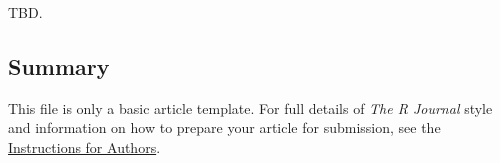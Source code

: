TBD.

\hypertarget{summary}{%
\subsection{Summary}\label{summary}}

This file is only a basic article template. For full details of
\emph{The R Journal} style and information on how to prepare your
article for submission, see the
\href{https://journal.r-project.org/share/author-guide.pdf}{Instructions
for Authors}.




\address{%
Brandon M. Greenwell\\
University of Cincinnati\\%
2925 Campus Green Dr\\ Cincinnati, OH 45221\\ United States of
America\\ ORCiD---\href{https://orcid.org/0000-0002-8120-0084}{0000-0002-8120-0084}\\
%
%
%
\\\href{mailto:greenwell.brandon@gmail.com}{\nolinkurl{greenwell.brandon@gmail.com}}
}

\address{%
\ldots{}\\
University of Cincinnati\\%
2925 Campus Green Dr\\ Cincinnati, OH 45221\\ United States of
America\\ ORCiD---\href{https://orcid.org/0000-0002-8120-0084}{0000-0002-8120-0084}\\
%
%
%
\\\href{mailto:greenwell.brandon@gmail.com}{\nolinkurl{greenwell.brandon@gmail.com}}
}
